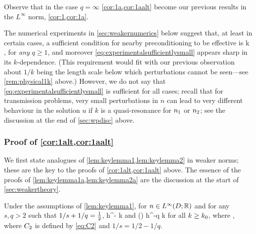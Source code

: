 Observe that in the case $q=\infty$ \cref{cor:1a,cor:1aalt} become our previous results in the $L^\infty$ norm, \cref{cor:1,cor:1a}.
\ere

The numerical experiments in \cref{sec:weakernumerics} below suggest that, at least in certain cases, a sufficient condition for nearby preconditioning to be effective is
\beq\label{eq:experimentalsufficientlysmall}
\NLqDRR{\no-\nt} k \quad{},
\eeq
for \emph{any} $q \geq 1$, and moreover \cref{eq:experimentalsufficientlysmall} appears sharp in its $k$-dependence. (This requirement would fit with our previous observation about $1/k$ being the length scale below which perturbations cannot be seen---see \cref{rem:physical1k} above.) However, we do not say that \cref{eq:experimentalsufficientlysmall} is sufficient for all cases; recall that for transmission problems, very small perturbations in $n$ can lead to very different behaviour in the solution $u$ if $k$ is a quasi-resonance for $n_{1}$ or $n_{2}$; see the discussion at the end of \cref{sec:wpdisc} above.


\subsubsection{Proof of \cref{cor:1alt,cor:1aalt}}

We first state analogues of \cref{lem:keylemma1,lem:keylemma2} in weaker norms; these  are the key to the proofs of \cref{cor:1alt,cor:1aalt} above. The essence of the proofs of \cref{lem:keylemma1a,lem:keylemma2a} are the discussion at the start of \cref{sec:weakertheory}.

\label{lem:keylemma1a}
Under the assumptions of \cref{lem:keylemma1}, for $n\in \LiDRR$ and for any $s,q > 2$ such that $1/s + 1/q = \frac{1}{2}$,
\beq\label{eq:keybound12}
\max\set{\NDk{\AmatoI \Mmatn},\NDkI{\Mmatn\AmatoI}} \leq \Cttilde h^{-} k
\eeq
and 
\beq\label{eq:keybound1a2}
\max\set{\Nt{\AmatoI \Mmatn},\Nt{\Mmatn\AmatoI}} \leq \Cttilde\mleft(\frac{\mplus}{\mminus}\mright) h^{-q} k
\eeq
for all $k\geq k_{0}$,
where
\beq\label{eq:C2tilde}
\Cttilde\de%
\Cinvs\Ct,
\eeq
where $C_{2}$ is defined by \cref{eq:C2} and $1/s = 1/2 - 1/q.$
\ele

